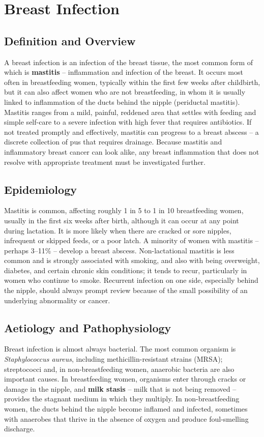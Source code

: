 \chapter{Breast Infection}

\section*{Definition and Overview}
A breast infection is an infection of the breast tissue, the most common form of which is \textbf{mastitis} -- inflammation and infection of the breast. It occurs most often in breastfeeding women, typically within the first few weeks after childbirth, but it can also affect women who are not breastfeeding, in whom it is usually linked to inflammation of the ducts behind the nipple (periductal mastitis). Mastitis ranges from a mild, painful, reddened area that settles with feeding and simple self-care to a severe infection with high fever that requires antibiotics. If not treated promptly and effectively, mastitis can progress to a breast abscess -- a discrete collection of pus that requires drainage. Because mastitis and inflammatory breast cancer can look alike, any breast inflammation that does not resolve with appropriate treatment must be investigated further.

\section*{Epidemiology}
Mastitis is common, affecting roughly 1 in 5 to 1 in 10 breastfeeding women, usually in the first six weeks after birth, although it can occur at any point during lactation. It is more likely when there are cracked or sore nipples, infrequent or skipped feeds, or a poor latch. A minority of women with mastitis -- perhaps 3--11\% -- develop a breast abscess. Non-lactational mastitis is less common and is strongly associated with smoking, and also with being overweight, diabetes, and certain chronic skin conditions; it tends to recur, particularly in women who continue to smoke. Recurrent infection on one side, especially behind the nipple, should always prompt review because of the small possibility of an underlying abnormality or cancer.

\section*{Aetiology and Pathophysiology}
Breast infection is almost always bacterial. The most common organism is \textit{Staphylococcus aureus}, including methicillin-resistant strains (MRSA); streptococci and, in non-breastfeeding women, anaerobic bacteria are also important causes. In breastfeeding women, organisms enter through cracks or damage in the nipple, and \textbf{milk stasis} -- milk that is not being removed -- provides the stagnant medium in which they multiply. In non-breastfeeding women, the ducts behind the nipple become inflamed and infected, sometimes with anaerobes that thrive in the absence of oxygen and produce foul-smelling discharge.

